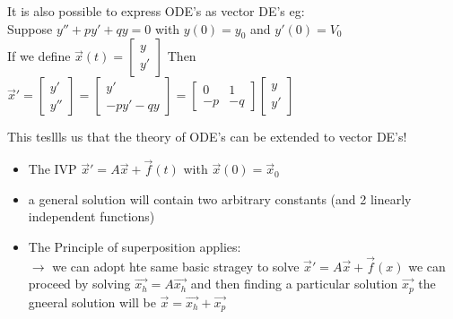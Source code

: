 \documentclass[12pt]{article}
\begin{document}
	 It is also possible to express ODE's as vector DE's
	 eg:\\
	 Suppose $y'' + py' + qy = 0$ with $y(0) = y_0$ and $y'(0) = V_0$\\
	 
	 If we define $\overrightarrow{x}(t) = \begin{bmatrix}
	 y \\ y'
	 \end{bmatrix}$
	 Then $\overrightarrow{x}' = \begin{bmatrix}
	 y' \\ y''
	 \end{bmatrix} = \begin{bmatrix}
	 y' \\ -py' - qy
	 \end{bmatrix} = \begin{bmatrix}
	 0 & 1 \\ -p & -q
	 \end{bmatrix} \begin{bmatrix}
	 y\\ y'
	 \end{bmatrix}$
	 
	 This tesllls us that the theory of ODE's can be extended to vector DE's!\\
	 \begin{itemize}
	 	\item The IVP $\overrightarrow{x}' = A\overrightarrow{x} + \overrightarrow{f}(t)$ with $\overrightarrow{x}(0) = \overrightarrow{x}_0$
	 	\item a general solution will contain two arbitrary constants (and 2 linearly independent functions)
	 	\item The Principle of superposition applies:\\
	 	$\rightarrow$ we can adopt hte same basic stragey to solve $\overrightarrow{x}' = A\overrightarrow{x} + \overrightarrow{f}(x)$ we can proceed by solving $\overrightarrow{x_h} = A\overrightarrow{x_h}$ and then finding a particular solution $\overrightarrow{x_p}$ the gneeral solution will be $\overrightarrow{x} = \overrightarrow{x_h} + \overrightarrow{x_p}$
	 \end{itemize}
\end{document}
